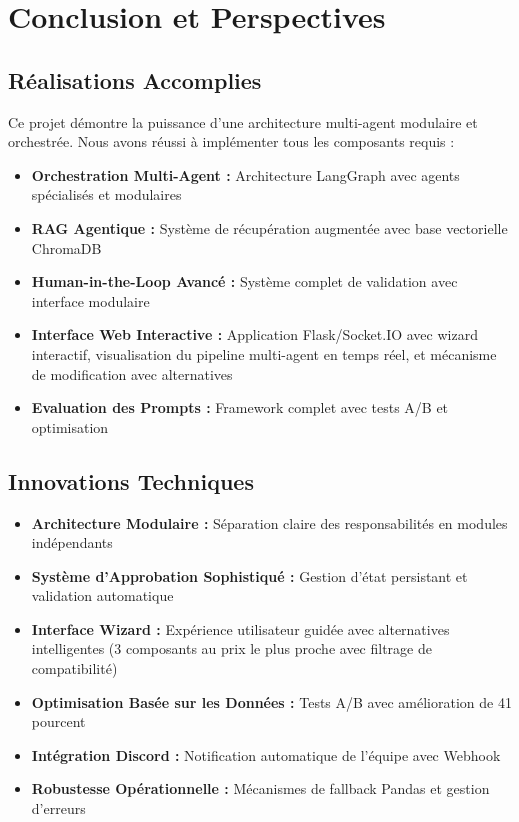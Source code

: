 \documentclass[12pt,a4paper]{article}
\begin{document}
\section{Conclusion et Perspectives}

\subsection{R\'ealisations Accomplies}
Ce projet d\'emontre la puissance d'une architecture multi-agent modulaire et orchestr\'ee. Nous avons r\'eussi \`a impl\'ementer tous les composants requis :

\begin{itemize}
    \item \textbf{Orchestration Multi-Agent :} Architecture LangGraph avec agents sp\'ecialis\'es et modulaires
    \item \textbf{RAG Agentique :} Syst\`eme de r\'ecup\'eration augment\'ee avec base vectorielle ChromaDB
    \item \textbf{Human-in-the-Loop Avanc\'e :} Syst\`eme complet de validation avec interface modulaire
    \item \textbf{Interface Web Interactive :} Application Flask/Socket.IO avec wizard interactif, visualisation du pipeline multi-agent en temps r\'eel, et m\'ecanisme de modification avec alternatives
    \item \textbf{Evaluation des Prompts :} Framework complet avec tests A/B et optimisation
\end{itemize}

\subsection{Innovations Techniques}
\begin{itemize}
    \item \textbf{Architecture Modulaire :} S\'eparation claire des responsabilit\'es en modules ind\'ependants
    \item \textbf{Syst\`eme d'Approbation Sophistiqu\'e :} Gestion d'\'etat persistant et validation automatique
    \item \textbf{Interface Wizard :} Exp\'erience utilisateur guid\'ee avec alternatives intelligentes (3 composants au prix le plus proche avec filtrage de compatibilit\'e)
    \item \textbf{Optimisation Bas\'ee sur les Donn\'ees :} Tests A/B avec am\'elioration de 41 pourcent
    \item \textbf{Int\'egration Discord :} Notification automatique de l'\'equipe avec Webhook
    \item \textbf{Robustesse Op\'erationnelle :} M\'ecanismes de fallback Pandas et gestion d'erreurs
\end{itemize}
\end{document}

